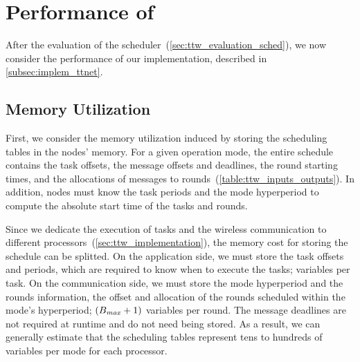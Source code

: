 \vspace{-10pt}
\section{Performance of \TTnet}
\label{sec:ttw_evaluation_implem}

After the evaluation of the \TTW scheduler~(\cref{sec:ttw_evaluation_sched}), we now consider the performance of our \TTnet implementation, described in \cref{subsec:implem_ttnet}.

\subsection{Memory Utilization}

First, we consider the memory utilization induced by storing the scheduling tables in the nodes' memory.
For a given operation mode, the entire schedule contains the task offsets, the message offsets and deadlines, the round starting times, and the allocations of messages to rounds~(\cref{table:ttw_inputs_outputs}).
In addition, nodes must know the task periods and the mode hyperperiod to compute the absolute start time of the tasks and rounds.

Since we dedicate the execution of tasks and the wireless communication to different processors~(\cref{sec:ttw_implementation}), the memory cost for storing the schedule can be splitted.
On the application side, we must store the task offsets and periods, which are required to know when to execute the tasks;  variables per task.
On the communication side, we must store the mode hyperperiod and the rounds information, \ie the offset and allocation of the rounds scheduled within the mode's hyperperiod; \ie $(B_{\mathit{max}}+1)$ variables per round.
The message deadlines are not required at runtime and do not need being stored.
As a result, we can generally estimate that the scheduling tables represent tens to hundreds of variables per mode for each processor.

\squarepar{%
  \fakepar{Conclusion}
  Our application and communication processors feature 64\kB~\cite{msp432} and 4\kB\cite{CC430F6137} of RAM, respectively. Thus, considering an average size of two\bytes per variable, storing the scheduling tables represent a significant overhead and limits the scalability of the system, in particular on the communication processor.
  This limitation would be significantly relaxed with newer platforms, which commonly feature 256\kB of RAM~\cite{nRF52840}.%
}

